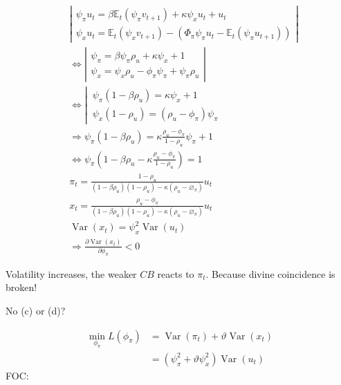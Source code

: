 {\begin{enumerate}[label=(\alph*)]
{$$
\begin{aligned}
& \left|\begin{array}{l}
\psi_{\pi} u_{t}=\beta \mathbb{E}_{t}\left(\psi_{\pi} v_{t+1}\right)+\kappa \psi_{x} u_{t}+u_{t} \\
\psi_{x} u_{t}=\mathbb{E}_{t}\left(\psi_{x} v_{t+1}\right)-\left(\Phi_{\pi} \psi_{\pi} u_{t}-\mathbb{E}_{t}\left(\psi_{\pi} u_{t+1}\right)\right)
\end{array}\right| \\
& \Leftrightarrow\left|\begin{array}{l}
\psi_{\pi}=\beta \psi_{\pi} \rho_{u}+\kappa \psi_{x}+1 \\
\psi_{x}=\psi_{x} \rho_{u}-\phi_{\pi} \psi_{\pi}+\psi_{\pi} \rho_{u}
\end{array}\right| \\
& \Leftrightarrow \left\lvert\, \begin{array}{l}
\psi_{\pi}\left(1-\beta \rho_{u}\right)=\kappa \psi_{x}+1 \\
\psi_{x}\left(1-\rho_{u}\right)=\left(\rho_{u}-\phi_{\pi}\right) \psi_{\pi}
\end{array}\right. \\
& \Longrightarrow \psi_{\pi}\left(1-\beta \rho_{u}\right)=\kappa \frac{\rho_{u}-\phi_{\pi}}{1-\rho_{u}} \psi_{\pi}+1 \\
& \Leftrightarrow \psi_{\pi}\left(1-\beta\rho_{u}-\kappa \frac{\rho_{u}-\phi_{\pi}}{1-\rho_{u}}\right)=1 \\
& \pi_{t}=\frac{1-\rho_{u}}{\left(1-\beta\rho_{u}\right)\left(1-\rho_{u}\right)-\kappa\left(\rho_{u}-\varnothing_{\pi}\right)} u_{t} \\
& x_{t}=\frac{\rho_{u}-\phi_{\pi}}{\left(1-\beta \rho_{u}\right)\left(1-\rho_{u}\right)-\kappa\left(\rho_{u}-\varnothing_{\pi}\right)} u_{t} \\
& \operatorname{Var}\left(x_{t}\right)=\psi_{x}^{2} \operatorname{Var}\left(u_{t}\right) \\
& \Rightarrow \frac{\partial \operatorname{Var}\left(x_{t}\right)}{\partial \phi_{\pi}}<0
\end{aligned}
$$

Volatility increases, the weaker $C B$ reacts to $\pi_{t}$. Because divine coincidence is broken!

\color{red} No (c) or (d)? \color{black}
}
{
\item[(e)]

$$
\begin{aligned}
\min _{\phi_{\pi}} L\left(\phi_{\pi}\right) &=\operatorname{Var}\left(\pi_{t}\right)+\vartheta \operatorname{Var}\left(x_{t}\right) \\
& =\left(\psi_{\pi}^{2}+\vartheta \psi_{x}^{2}\right) \operatorname{Var}\left(u_{t}\right) 
\end{aligned}
$$
FOC:

}
\end{enumerate}}
